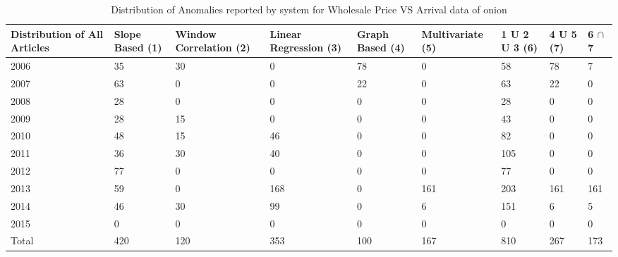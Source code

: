 \documentclass[a4paper,10pt]{report}
\begin{document}
	
	\begin{table}[]
	\centering
	\resizebox{\textwidth}{!}
	{\begin{tabular}{|l|l|l|l|l|l|l|l|l|}
	\hline
	Distribution of All Articles & Slope Based (1) & Window Correlation (2) & Linear Regression (3) & Graph Based (4) & Multivariate (5) & 1 U 2 U 3 (6) & 4 U 5 (7) & 6  $\cap$ 7 \\
	\hline
	2006                         & 35          & 30          & 0                 & 78          & 0             & 58        & 78    & 7                                     \\
	\hline
	2007                         & 63          & 0           & 0                 & 22          & 0             & 63        & 22    & 0                                     \\
	\hline
	2008                         & 28          & 0           & 0                 & 0           & 0             & 28        & 0     & 0                                     \\
	\hline
	2009                         & 28          & 15          & 0                 & 0           & 0             & 43        & 0     & 0                                     \\
	\hline
	2010                         & 48          & 15          & 46                & 0           & 0             & 82        & 0     & 0                                     \\
	\hline
	2011                         & 36          & 30          & 40                & 0           & 0             & 105       & 0     & 0                                     \\
	\hline
	2012                         & 77          & 0           & 0                 & 0           & 0             & 77        & 0     & 0                                     \\
	\hline
	2013                         & 59          & 0           & 168               & 0           & 161           & 203       & 161   & 161                                   \\
	\hline
	2014                         & 46          & 30          & 99                & 0           & 6             & 151       & 6     & 5                                     \\
	\hline
	2015                         & 0           & 0           & 0                 & 0           & 0             & 0         & 0     & 0                                     \\
	\hline
	Total			    & 420         & 120         & 353               & 100         & 167           & 810       & 267   & 173                                   \\
	\hline
	\end{tabular}}
	\caption{Distribution of Anomalies reported by system for Wholesale Price VS Arrival data of onion }
	\label{WholesaleVsArrivalDist}
	\end{table}
	
\end{document}
